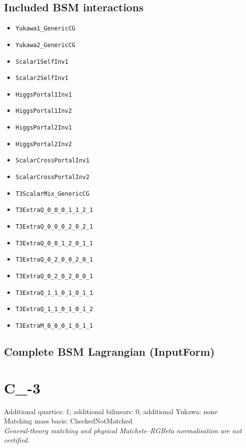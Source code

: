 \documentclass[10pt,a4paper]{article}
\begin{document}
\subsection*{Included BSM interactions}
\begin{itemize}
\item \texttt{Yukawa1\_GenericCG}
\item \texttt{Yukawa2\_GenericCG}
\item \texttt{Scalar1SelfInv1}
\item \texttt{Scalar2SelfInv1}
\item \texttt{HiggsPortal1Inv1}
\item \texttt{HiggsPortal1Inv2}
\item \texttt{HiggsPortal2Inv1}
\item \texttt{HiggsPortal2Inv2}
\item \texttt{ScalarCrossPortalInv1}
\item \texttt{ScalarCrossPortalInv2}
\item \texttt{T3ScalarMix\_GenericCG}
\item \texttt{T3ExtraQ\_0\_0\_0\_1\_1\_2\_1}
\item \texttt{T3ExtraQ\_0\_0\_0\_2\_0\_2\_1}
\item \texttt{T3ExtraQ\_0\_0\_1\_2\_0\_1\_1}
\item \texttt{T3ExtraQ\_0\_2\_0\_0\_2\_0\_1}
\item \texttt{T3ExtraQ\_0\_2\_0\_2\_0\_0\_1}
\item \texttt{T3ExtraQ\_1\_1\_0\_1\_0\_1\_1}
\item \texttt{T3ExtraQ\_1\_1\_0\_1\_0\_1\_2}
\item \texttt{T3ExtraM\_0\_0\_0\_1\_0\_1\_1}
\end{itemize}
\subsection*{Complete BSM Lagrangian (InputForm)}

\clearpage
\section{C\_-3}
Additional quartics: 1; additional bilinears: 0; additional Yukawa: none\\
Matching mass basis: CheckedNotMatched\\
\emph{General-theory matching and physical Matchete--RGBeta normalisation are not certified.}
\end{document}
